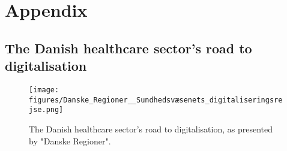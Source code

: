 \section{Appendix}

\subsection{The Danish healthcare sector's road to digitalisation}
\begin{figure}[H]
    \centering
    \texttt{[image: figures/Danske\_Regioner\_\_Sundhedsvæsenets\_digitaliseringsrejse.png]}
    \caption{The Danish healthcare sector's road to digitalisation, as presented by "Danske Regioner"\cite{Den-Reg-digitalisation}.}
    \label{fig:healthcare_digitalisation}
\end{figure}